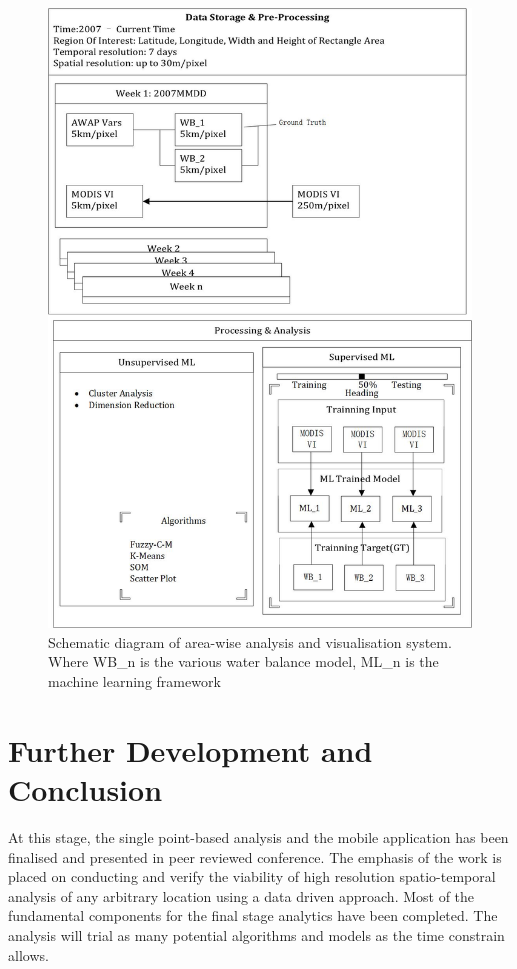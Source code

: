 \documentclass[12pt,journal,compsoc,onecolumn]{IEEEtran}
\begin{document}
\begin{figure}[H]
\begin{center}
	\includegraphics[width = 14cm]{Drawing1.jpg}
	\caption{Schematic diagram of area-wise analysis and visualisation system. Where WB\_n is the various water balance model, ML\_n is the machine learning framework}
	\label{fig:areaschematic}
\end{center}
\end{figure}
\section{Further Development and Conclusion}

At this stage, the single point-based analysis and the mobile application has been finalised and presented in peer reviewed conference. The emphasis of the work is placed on conducting and verify the viability of high resolution spatio-temporal analysis of any arbitrary location using a data driven approach. Most of the fundamental components for the final stage analytics have been completed. The analysis will trial as many potential algorithms and models as the time constrain allows.

\newpage
\appendix


	
\end{document}
